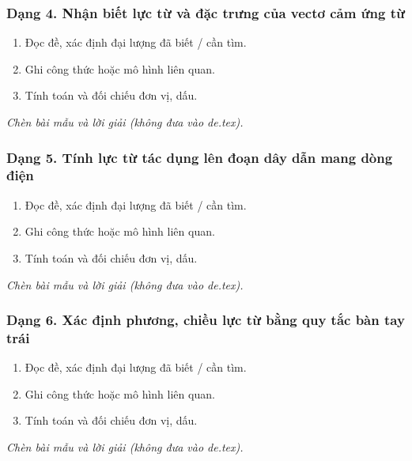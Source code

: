 \subsubsection{Dạng 4. Nhận biết lực từ và đặc trưng của vectơ cảm ứng từ}
\begin{phuongphap}
\begin{enumerate}
\item Đọc đề, xác định đại lượng đã biết / cần tìm.
\item Ghi công thức hoặc mô hình liên quan.
\item Tính toán và đối chiếu đơn vị, dấu.
\end{enumerate}
\end{phuongphap}
\begin{vidumau}
\textit{Chèn bài mẫu và lời giải (không đưa vào de.tex).}
\end{vidumau}

\subsubsection{Dạng 5. Tính lực từ tác dụng lên đoạn dây dẫn mang dòng điện}
\begin{phuongphap}
\begin{enumerate}
\item Đọc đề, xác định đại lượng đã biết / cần tìm.
\item Ghi công thức hoặc mô hình liên quan.
\item Tính toán và đối chiếu đơn vị, dấu.
\end{enumerate}
\end{phuongphap}
\begin{vidumau}
\textit{Chèn bài mẫu và lời giải (không đưa vào de.tex).}
\end{vidumau}

\subsubsection{Dạng 6. Xác định phương, chiều lực từ bằng quy tắc bàn tay trái}
\begin{phuongphap}
\begin{enumerate}
\item Đọc đề, xác định đại lượng đã biết / cần tìm.
\item Ghi công thức hoặc mô hình liên quan.
\item Tính toán và đối chiếu đơn vị, dấu.
\end{enumerate}
\end{phuongphap}
\begin{vidumau}
\textit{Chèn bài mẫu và lời giải (không đưa vào de.tex).}
\end{vidumau}

